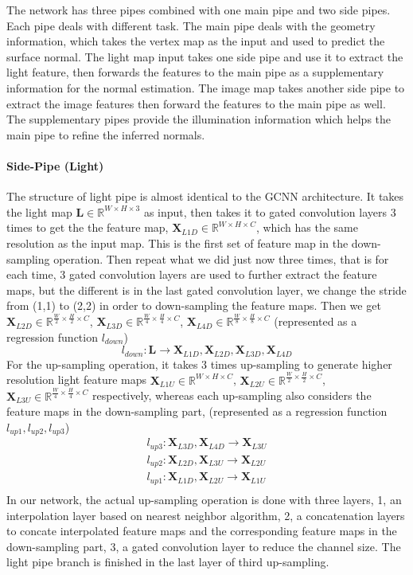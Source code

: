 The network has three pipes combined with one main pipe and two side pipes. Each pipe deals with different task. The main pipe deals with the geometry information, which takes the vertex map as the input and used to predict the surface normal. The light map input takes one side pipe and use it to extract the light feature, then forwards the features to the main pipe as a supplementary information for the normal estimation. The image map takes another side pipe to extract the image features then forward the features to the main pipe as well. The supplementary pipes provide the illumination information which helps the main pipe to refine the inferred normals.

\paragraph{Side-Pipe (Light)}
The structure of light pipe is almost identical to the GCNN architecture. It takes the light map $ \textbf{L} \in \mathbb{R}^{W\times H\times 3}$ as input, then takes it to gated convolution layers 3 times to get the the feature map,
$ \textbf{X}_{L1D} \in \mathbb{R}^{{W}\times H\times C} $,
 which has the same resolution as the input map. This is the first set of feature map in the down-sampling operation.
 Then repeat what we did just now three times, that is for each time, 3 gated convolution layers are used to further extract the feature maps, but the different is in the last gated convolution layer, we change the stride from (1,1) to (2,2) in order to down-sampling the feature maps. Then we get
$ \textbf{X}_{L2D} \in \mathbb{R}^{\frac{W}{2}\times \frac{H}{2}\times C} $,
$ \textbf{X}_{L3D} \in \mathbb{R}^{\frac{W}{4}\times \frac{H}{4}\times C} $,
$ \textbf{X}_{L4D} \in \mathbb{R}^{\frac{W}{8}\times \frac{H}{8}\times C} $
(represented as a regression function $ l_{down} $)
\[ l_{down}: \textbf{L} \rightarrow  \textbf{X}_{L1D} , \textbf{X}_{L2D}, \textbf{X}_{L3D}, \textbf{X}_{L4D} \]
For the up-sampling operation, it takes 3 times up-sampling to generate higher resolution light feature maps
$ \textbf{X}_{L1U} \in \mathbb{R}^{{W}\times {H}\times C} $,
$ \textbf{X}_{L2U} \in \mathbb{R}^{\frac{W}{2}\times \frac{H}{2}\times C} $,
$ \textbf{X}_{L3U} \in \mathbb{R}^{\frac{W}{4}\times \frac{H}{4}\times C} $ respectively, whereas each up-sampling also considers the feature maps in the down-sampling part,
(represented as a regression function $ l_{up1}, l_{up2}, l_{up3} $)
\[ 
\begin{matrix}
	l_{up3} : \textbf{X}_{L3D}, \textbf{X}_{L4D} \rightarrow \textbf{X}_{L3U} \\
	l_{up2} : \textbf{X}_{L2D}, \textbf{X}_{L3U} \rightarrow \textbf{X}_{L2U} \\
	l_{up1} : \textbf{X}_{L1D}, \textbf{X}_{L2U} \rightarrow \textbf{X}_{L1U} \\
\end{matrix}
\]
In our network, the actual up-sampling operation is done with three layers, 1, an interpolation layer based on nearest neighbor algorithm, 2, a concatenation layers to concate interpolated feature maps and the corresponding feature maps in the down-sampling part, 3, a gated convolution layer to reduce the channel size.
The light pipe branch is finished in the last layer of third up-sampling.

